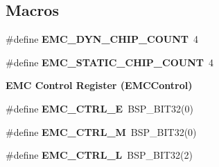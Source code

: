 \subsection*{Macros}
\begin{DoxyCompactItemize}
\item 
\#define {\bfseries E\+M\+C\+\_\+\+D\+Y\+N\+\_\+\+C\+H\+I\+P\+\_\+\+C\+O\+U\+NT}~4
\item 
\#define {\bfseries E\+M\+C\+\_\+\+S\+T\+A\+T\+I\+C\+\_\+\+C\+H\+I\+P\+\_\+\+C\+O\+U\+NT}~4
\end{DoxyCompactItemize}
\begin{Indent}\textbf{ E\+MC Control Register (E\+M\+C\+Control)}\par
\begin{DoxyCompactItemize}
\item 
\#define {\bfseries E\+M\+C\+\_\+\+C\+T\+R\+L\+\_\+E}~B\+S\+P\+\_\+\+B\+I\+T32(0)
\item 
\#define {\bfseries E\+M\+C\+\_\+\+C\+T\+R\+L\+\_\+M}~B\+S\+P\+\_\+\+B\+I\+T32(0)
\item 
\#define {\bfseries E\+M\+C\+\_\+\+C\+T\+R\+L\+\_\+L}~B\+S\+P\+\_\+\+B\+I\+T32(2)
\end{DoxyCompactItemize}
\end{Indent}
